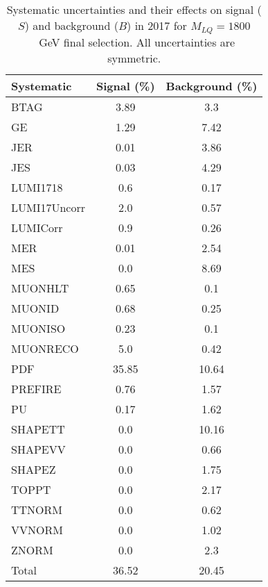 \begin{table}[htbp]
\begin{center}
\caption{Systematic uncertainties and their effects on signal ($S$) and background ($B$) in 2017 for $M_{LQ}=1800$~GeV final selection. All uncertainties are symmetric.}
\begin{tabular}{lcc}
\hline\hline
Systematic & Signal (\%) & Background (\%) \\ \hline 
BTAG & 3.89 & 3.3\\ 
GE & 1.29 & 7.42\\ 
JER & 0.01 & 3.86\\ 
JES & 0.03 & 4.29\\ 
LUMI1718 & 0.6 & 0.17\\ 
LUMI17Uncorr & 2.0 & 0.57\\ 
LUMICorr & 0.9 & 0.26\\ 
MER & 0.01 & 2.54\\ 
MES & 0.0 & 8.69\\ 
MUONHLT & 0.65 & 0.1\\ 
MUONID & 0.68 & 0.25\\ 
MUONISO & 0.23 & 0.1\\ 
MUONRECO & 5.0 & 0.42\\ 
PDF & 35.85 & 10.64\\ 
PREFIRE & 0.76 & 1.57\\ 
PU & 0.17 & 1.62\\ 
SHAPETT & 0.0 & 10.16\\ 
SHAPEVV & 0.0 & 0.66\\ 
SHAPEZ & 0.0 & 1.75\\ 
TOPPT & 0.0 & 2.17\\ 
TTNORM & 0.0 & 0.62\\ 
VVNORM & 0.0 & 1.02\\ 
ZNORM & 0.0 & 2.3\\ 
Total & 36.52 & 20.45\\ \hline \hline
\end{tabular}
\label{tab:SysUncertainties_uujj_1800}
\end{center}
\end{table}

